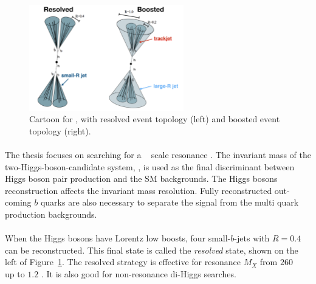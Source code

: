 \begin{figure}[htbp!]
  \centering
  \includegraphics[width=0.6\textwidth]{figures/theory/resolved_boosted}
  \caption{Cartoon for \Xtohhb, with resolved event topology (left) and boosted event topology (right).}
  \label{fig:resolved_bosted}
\end{figure}

\paragraph{}
The thesis focuses on searching for a \TeV~ scale resonance \Xtohhb. 
The invariant mass of the two-Higgs-boson-candidate system, \mtwoJ, is used as the final discriminant between Higgs boson pair production and the SM backgrounds.
The Higgs bosons reconstruction affects the \mtwoJ invariant mass resolution.
Fully reconstructed out-coming $b$ quarks are also necessary to separate the signal from the multi quark production backgrounds.

\paragraph{}
When the Higgs bosons have Lorentz low boosts, four small-\R $b$-jets with $R=0.4$ can be reconstructed.
This final state is called the \textit{resolved} state, shown on the left of Figure~\ref{fig:resolved_bosted}.
The resolved strategy is effective for resonance $M_X$ from $260$ \GeV~ up to $1.2$ \TeV.
It is also good for non-resonance di-Higgs searches.

